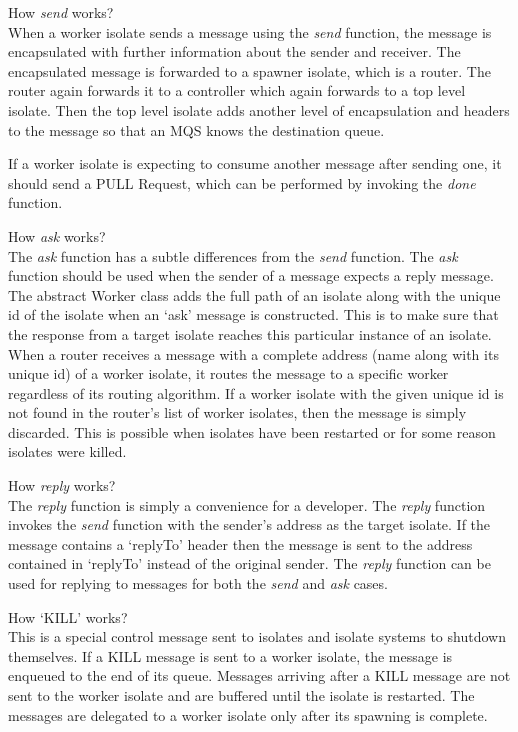   \begin{description}
    \item How \emph{send} works?\\
      When a worker isolate sends a message using the \emph{send} function, the message is encapsulated with further information about the sender and receiver. The encapsulated message is forwarded to a spawner isolate, which is a router. The router again forwards it to a controller which again forwards to a top level isolate. Then the top level isolate adds another level of encapsulation and headers to the message so that an MQS knows the destination queue.

      If a worker isolate is expecting to consume another message after sending one, it should send a PULL Request, which can be performed by invoking the \emph{done} function.

      \item \label{itm:askWorking}How \emph{ask} works?\\
    The \emph{ask} function has a subtle differences from the \emph{send} function. The \emph{ask} function should be used when the sender of a message expects a reply message. The abstract Worker class adds the full path of an isolate along with the unique id of the isolate when an ‘ask’ message is constructed. This is to make sure that the response from a target isolate reaches this particular instance of an isolate. When a router receives a message with a complete address (name along with its unique id) of a worker isolate, it routes the message to a specific worker regardless of its routing algorithm. If a worker isolate with the given unique id is not found in the router's list of worker isolates, then the message is simply discarded. This is possible when isolates have been restarted or for some reason isolates were killed.

    \item How \emph{reply} works?\\
    The \emph{reply} function is simply a convenience for a developer. The \emph{reply} function invokes the \emph{send} function with the sender’s address as the target isolate. If the message contains a ‘replyTo’ header then the message is sent to the address contained in ‘replyTo’ instead of the original sender. The \emph{reply} function can be used for replying to messages for both the \emph{send} and \emph{ask} cases.

    \item \label{itm:killWorking} How ‘KILL’ works?\\
    This is a special control message sent to isolates and isolate systems to shutdown themselves. If a KILL message is sent to a worker isolate, the message is enqueued to the end of its queue. Messages arriving after a KILL message are not sent to the worker isolate and are buffered until the isolate is restarted. The messages are delegated to a worker isolate only after its spawning is complete.


\end{description}
